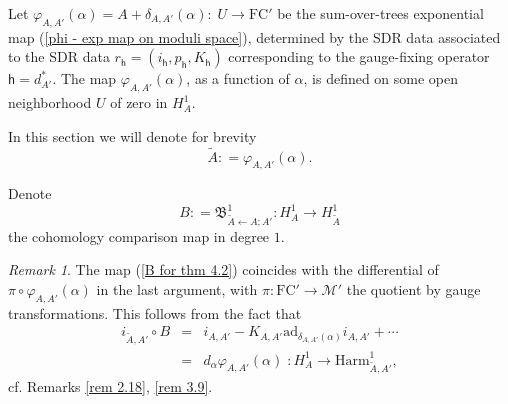 \documentclass[11pt,a4paper]{amsart}
\theoremstyle{plain} %
\theoremstyle{definition}
\theoremstyle{remark}
\newtheorem{rem}[thm]{Remark}
\newcommand{\mr}{\mathrm}
\newcommand{\ra}{\rightarrow}
\newcommand{\sh}{\mathsf{h}}
\newcommand{\M}{\mathcal{M}}
\newcommand{\til}{\widetilde}
\newcommand{\FC}{\mathrm{FC}}
\newcommand{\la}{\leftarrow}
\newcommand{\BB}{\mathfrak{B}}
\begin{document}
{Let $\varphi_{A,A'}(\alpha)=A+\delta_{A,A'}(\alpha)\colon\; U \ra \FC'$ be the sum-over-trees exponential map (\ref{phi - exp map on moduli space}), determined by the 
SDR data
associated to the SDR data $r_\sh = (i_\sh,p_\sh,K_\sh)$ corresponding to the gauge-fixing operator $\sh=d^*_{A'}$. The map $\varphi_{A,A'}(\alpha)$, as a function of $\alpha$, is defined on some open neighborhood $U$ of zero in $H^1_{A}$.

In this section we will denote for brevity  
\begin{equation}\label{Atilde}
\til{A}\colon= \varphi_{A,A'}(\alpha).
\end{equation}

Denote
\begin{equation}\label{B for thm 4.2}
    B\colon = %
    \BB^1_{\til{A}\la A;A'}\colon H^1_{A}\ra H^1_{\til{A}}
\end{equation}
the cohomology comparison map in degree $1$. 


\begin{rem}\label{rem: d underline phi = B}
The map (\ref{B for thm 4.2}) coincides with the differential of $\pi\circ \varphi_{A,A'}(\alpha)$ in the last argument, with $\pi\colon \FC' \ra \M'$ the quotient by gauge transformations. This follows from the fact that
\begin{equation}\label{i B = d phi}
\begin{aligned}
    i_{\til{A},A'}\circ B %
    &=&
    i_{A,A'}-K_{A,A'}\mr{ad}_{\delta_{A,A'}(\alpha)}i_{A,A'}+\cdots 
    \\
    &=& d_\alpha\varphi_{A,A'}(\alpha)\;\colon H_{A}^1\ra \mr{Harm}^1_{\til{A},A'},
\end{aligned}
\end{equation}
cf. Remarks \ref{rem 2.18}, \ref{rem 3.9}.
\end{rem}

}
\end{document}
